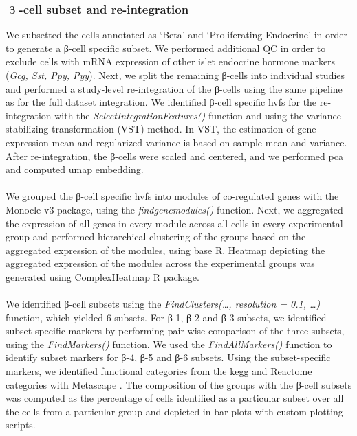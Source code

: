\subsubsection{\large \( \mathbf{\upbeta} \)-cell subset and re-integration}
We subsetted the cells annotated as `Beta' and `Proliferating-Endocrine' in order to generate a β-cell specific subset. We performed additional QC in order to exclude cells with mRNA expression of other islet endocrine hormone markers (\textit{Gcg, Sst, Ppy, Pyy}). Next, we split the remaining β-cells into individual studies and performed a study-level re-integration of the β-cells using the same pipeline as for the full dataset integration. We identified β-cell specific \glspl{hvf} for the re-integration with the \textit{SelectIntegrationFeatures()} function and using the variance stabilizing transformation (VST) method. In VST, the estimation of gene expression mean and regularized variance is based on sample mean and variance. After re-integration, the β-cells were scaled and centered, and we performed \gls{pca} and computed \gls{umap} embedding.\\\\
We grouped the β-cell specific \glspl{hvf} into modules of co-regulated genes with the Monocle v3 package, using the \textit{find\textunderscore gene\textunderscore modules()} function. Next, we aggregated the expression of all genes in every module across all cells in every experimental group and performed hierarchical clustering of the groups based on the aggregated expression of the modules, using base R. Heatmap depicting the aggregated expression of the modules across the experimental groups was generated using ComplexHeatmap R package.\\\\

We identified β-cell subsets using the \textit{FindClusters(…, resolution = 0.1, …)} function, which yielded 6 subsets. For β-1, β-2 and β-3 subsets, we identified subset-specific markers by performing pair-wise comparison of the three subsets, using the \textit{FindMarkers()} function. We used the \textit{FindAllMarkers()} function to identify subset markers for β-4, β-5 and β-6 subsets. Using the subset-specific markers, we identified functional categories from the \gls{kegg} and Reactome categories with Metascape \textbf{\cite{zhou_metascape_2019}}. The composition of the groups with the β-cell subsets was computed as the percentage of cells identified as a particular subset over all the cells from a particular group and depicted in bar plots with custom plotting scripts.

